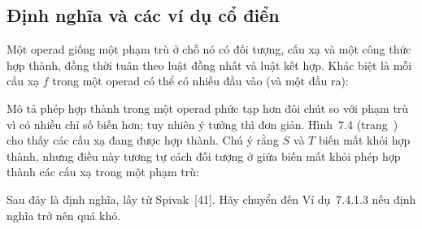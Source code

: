 \subsection{Định nghĩa và các ví dụ cổ điển}
Một operad giống một phạm trù ở chỗ nó có đối tượng, cấu xạ và một công thức hợp thành, đồng thời tuân theo luật đồng nhất và luật kết hợp. Khác biệt là mỗi cấu xạ $f$ trong một operad có thể có nhiều đầu vào (và một đầu ra):
\begin{center}
\end{center}
Mô tả phép hợp thành trong một operad phức tạp hơn đôi chút so với phạm trù vì có nhiều chỉ số biến hơn; tuy nhiên ý tưởng thì đơn giản. Hình~7.4 (trang~\pageref{fig:ctseven-operad-composition}) cho thấy các cấu xạ đang được hợp thành. Chú ý rằng $S$ và $T$ biến mất khỏi hợp thành, nhưng điều này tương tự cách đối tượng ở giữa biến mất khỏi phép hợp thành các cấu xạ trong một phạm trù:
\begin{center}
\end{center}
Sau đây là định nghĩa, lấy từ Spivak~[41]. Hãy chuyển đến Ví dụ~7.4.1.3 nếu định nghĩa trở nên quá khó.

